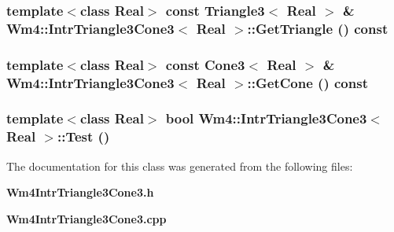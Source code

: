 \subsubsection{\setlength{\rightskip}{0pt plus 5cm}template$<$class Real$>$ const Triangle3$<$ Real $>$ \& {\bf Wm4::Intr\-Triangle3Cone3}$<$ Real $>$::Get\-Triangle () const}\label{classWm4_1_1IntrTriangle3Cone3_620beb552e82511bcf2b67f1a1de220a}


\subsubsection{\setlength{\rightskip}{0pt plus 5cm}template$<$class Real$>$ const Cone3$<$ Real $>$ \& {\bf Wm4::Intr\-Triangle3Cone3}$<$ Real $>$::Get\-Cone () const}\label{classWm4_1_1IntrTriangle3Cone3_2a4d8302b291f20a934edeb305050e1e}


\subsubsection{\setlength{\rightskip}{0pt plus 5cm}template$<$class Real$>$ bool {\bf Wm4::Intr\-Triangle3Cone3}$<$ Real $>$::Test ()\hspace{0.3cm}{\tt  [virtual]}}\label{classWm4_1_1IntrTriangle3Cone3_e47fccb80478b76bb474ee8768fbacdd}




The documentation for this class was generated from the following files:\begin{CompactItemize}
\item 
{\bf Wm4Intr\-Triangle3Cone3.h}\item 
{\bf Wm4Intr\-Triangle3Cone3.cpp}\end{CompactItemize}
